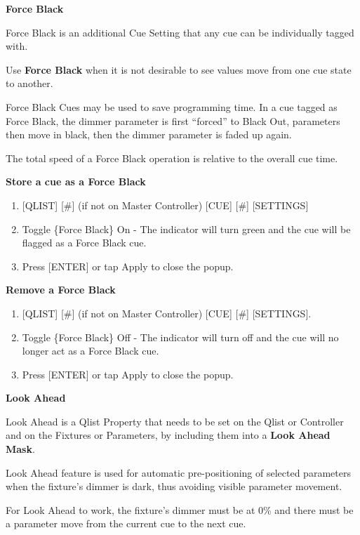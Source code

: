 \documentclass[
]{article}
\begin{document}
\textbf{Force Black}

Force Black is an additional Cue Setting that any cue can be individually tagged with.

Use \textbf{Force Black} when it is not desirable to see values move from one cue state to another.

Force Black Cues may be used to save programming time. In a cue tagged as Force Black, the dimmer parameter is first ``forced'' to Black Out, parameters then move in black, then the dimmer parameter is faded up again.

The total speed of a Force Black operation is relative to the overall cue time.

\textbf{Store a cue as a Force Black}

\begin{enumerate}
\def\labelenumi{\arabic{enumi}.}
\item
  {[}QLIST{]} {[}\#{]} (if not on Master Controller) {[}CUE{]} {[}\#{]} {[}SETTINGS{]}
\item
  Toggle \{Force Black\} On - The indicator will turn green and the cue will be flagged as a Force Black cue.
\item
  Press {[}ENTER{]} or tap Apply to close the popup.
\end{enumerate}

\textbf{Remove a Force Black}

\begin{enumerate}
\def\labelenumi{\arabic{enumi}.}
\item
  {[}QLIST{]} {[}\#{]} (if not on Master Controller) {[}CUE{]} {[}\#{]} {[}SETTINGS{]}.
\item
  Toggle \{Force Black\} Off - The indicator will turn off and the cue will no longer act as a Force Black cue.
\item
  Press {[}ENTER{]} or tap Apply to close the popup.
\end{enumerate}

\textbf{Look Ahead}

Look Ahead is a Qlist Property that needs to be set on the Qlist or Controller and on the Fixtures or Parameters, by including them into a \textbf{Look Ahead Mask}.

Look Ahead feature is used for automatic pre-positioning of selected parameters when the fixture's dimmer is dark, thus avoiding visible parameter movement.

For Look Ahead to work, the fixture's dimmer must be at 0\% and there must be a parameter move from the current cue to the next cue.
\end{document}

